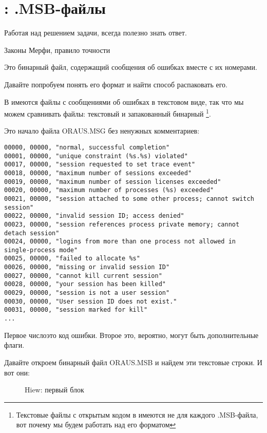 ﻿\section{\oracle: .MSB-файлы\ESph{}\PTBRph{}\PLph{}\ITAph{}\DEph{}\NLph{}}
\myindex{\oracle}

\epigraph{Работая над решением задачи, всегда полезно знать ответ.}{Законы Мерфи, правило точности}

Это бинарный файл, содержащий сообщения об ошибках вместе с их номерами.

Давайте попробуем понять его формат и найти способ распаковать его.

В \oracle имеются файлы с сообщениями об ошибках в текстовом виде, так что мы можем сравнивать файлы:
текстовый и запакованный бинарный
\footnote{Текстовые файлы с открытым кодом в \oracle имеются не для каждого .MSB-файла, вот почему мы будем работать над его форматом}.

Это начало файла ORAUS.MSG без ненужных комментариев:

\begin{lstlisting}[caption=Начало файла ORAUS.MSG без комментариев]
00000, 00000, "normal, successful completion"
00001, 00000, "unique constraint (%s.%s) violated"
00017, 00000, "session requested to set trace event"
00018, 00000, "maximum number of sessions exceeded"
00019, 00000, "maximum number of session licenses exceeded"
00020, 00000, "maximum number of processes (%s) exceeded"
00021, 00000, "session attached to some other process; cannot switch session"
00022, 00000, "invalid session ID; access denied"
00023, 00000, "session references process private memory; cannot detach session"
00024, 00000, "logins from more than one process not allowed in single-process mode"
00025, 00000, "failed to allocate %s"
00026, 00000, "missing or invalid session ID"
00027, 00000, "cannot kill current session"
00028, 00000, "your session has been killed"
00029, 00000, "session is not a user session"
00030, 00000, "User session ID does not exist."
00031, 00000, "session marked for kill"
...
\end{lstlisting}

Первое число\EMDASH{}это код ошибки.
Второе это, вероятно, могут быть дополнительные флаги.

\clearpage
Давайте откроем бинарный файл ORAUS.MSB и найдем эти текстовые строки. 
И вот они:

\begin{figure}[H]
\centering
{}
\caption{Hiew: первый блок}
\label{fig:oracle_MSB_1}
\end{figure}

